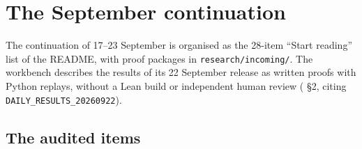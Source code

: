 \section{The September continuation}\label{sec:items}

The continuation of 17--23 September is organised as the 28-item ``Start reading'' list of the README, with proof packages in \texttt{research/incoming/}. The workbench describes the results of its 22 September release as written proofs with Python replays, without a Lean build or independent human review ( §2, citing \texttt{DAILY\_RESULTS\_20260922}).

\subsection{The audited items}

